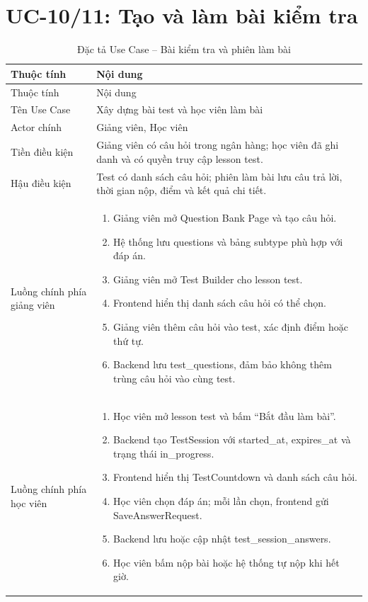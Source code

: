 \documentclass[12pt,a4paper]{report}
\begin{document}
\section{UC-10/11: Tạo và làm bài kiểm tra}
\begin{longtable}{L{4cm} L{10.5cm}}
\caption{Đặc tả Use Case -- Bài kiểm tra và phiên làm bài}\label{tab:uc-test}\\
\toprule
Thuộc tính & Nội dung \\
\midrule
\endfirsthead
\toprule
Thuộc tính & Nội dung \\
\midrule
\endhead
Tên Use Case & Xây dựng bài test và học viên làm bài \\
Actor chính & Giảng viên, Học viên \\
Tiền điều kiện & Giảng viên có câu hỏi trong ngân hàng; học viên đã ghi danh và có quyền truy cập lesson test. \\
Hậu điều kiện & Test có danh sách câu hỏi; phiên làm bài lưu câu trả lời, thời gian nộp, điểm và kết quả chi tiết. \\
Luồng chính phía giảng viên & \begin{enumerate}[leftmargin=*]
\item Giảng viên mở Question Bank Page và tạo câu hỏi.
\item Hệ thống lưu questions và bảng subtype phù hợp với đáp án.
\item Giảng viên mở Test Builder cho lesson test.
\item Frontend hiển thị danh sách câu hỏi có thể chọn.
\item Giảng viên thêm câu hỏi vào test, xác định điểm hoặc thứ tự.
\item Backend lưu test\_questions, đảm bảo không thêm trùng câu hỏi vào cùng test.
\end{enumerate} \\
Luồng chính phía học viên & \begin{enumerate}[leftmargin=*]
\item Học viên mở lesson test và bấm ``Bắt đầu làm bài''.
\item Backend tạo TestSession với started\_at, expires\_at và trạng thái in\_progress.
\item Frontend hiển thị TestCountdown và danh sách câu hỏi.
\item Học viên chọn đáp án; mỗi lần chọn, frontend gửi SaveAnswerRequest.
\item Backend lưu hoặc cập nhật test\_session\_answers.
\item Học viên bấm nộp bài hoặc hệ thống tự nộp khi hết giờ.

\end{enumerate}
\end{longtable}
\end{document}
